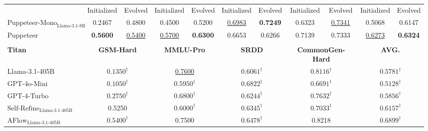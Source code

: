 \documentclass{article}
\begin{document}
\begin{table}[ht]
{\begin{tabular}{lcccccccccc}
\cmidrule(r){2-11} 
& Initialized & Evolved & Initialized & Evolved & Initialized & Evolved & Initialized & Evolved & Initialized & Evolved \\
\cmidrule(r){2-3} \cmidrule(r){4-5} \cmidrule(r){6-7} \cmidrule(r){8-9} \cmidrule(r){10-11}
\rowcolor{gray!6}
$\text{Puppeteer-Mono}_{\text{Llama-3.1-8B}}$ & 0.2467 & 0.4800 & 0.4500 & 0.5200 & \underline{0.6983} & \textbf{0.7249} & 0.6323 & \underline{0.7341} & 0.5068 &0.6147 \\
Puppeteer & \textbf{0.5600} & \underline{0.5400} & \underline{0.5700} & \textbf{0.6300} & 0.6653 & 0.6266 & 0.7139 & 0.7333 & \underline{0.6273} & \textbf{0.6324} \\
\bottomrule
\\[3pt] 
\toprule 
\textbf{Titan}
& \multicolumn{2}{c}{\textbf{GSM-Hard}} & \multicolumn{2}{c}{\textbf{MMLU-Pro}} & \multicolumn{2}{c}{\textbf{SRDD}} & \multicolumn{2}{c}{\textbf{CommonGen-Hard}} & \multicolumn{2}{c}{\textbf{AVG.}} \\
\midrule
\rowcolor{gray!6}
Llama-3.1-405B & \multicolumn{2}{c}{\(\text{0.1350}^{\dagger}\)} & \multicolumn{2}{c}{\underline{0.7600}} & \multicolumn{2}{c}{\(\text{0.6061}^{\dagger}\)} & \multicolumn{2}{c}{\(\text{0.8116}^{\dagger}\)} & \multicolumn{2}{c}{\(\text{0.5781}^{\dagger}\)} \\
GPT-4o-Mini & \multicolumn{2}{c}{\(\text{0.1050}^{\dagger}\)} & \multicolumn{2}{c}{\(\text{0.5950}^{\dagger}\)} & \multicolumn{2}{c}{\(\text{0.6822}^{\dagger}\)} & \multicolumn{2}{c}{\(\text{0.6691}^{\dagger}\)} & \multicolumn{2}{c}{\(\text{0.5128}^{\dagger}\)} \\
\rowcolor{gray!6}
GPT-4-Turbo & \multicolumn{2}{c}{\(\text{0.2750}^{\dagger}\)} & \multicolumn{2}{c}{\(\text{0.6800}^{\dagger}\)} & \multicolumn{2}{c}{\(\text{0.6244}^{\dagger}\)} & \multicolumn{2}{c}{\(\text{0.7632}^{\dagger}\)} & \multicolumn{2}{c}{\(\text{0.5856}^{\dagger}\)} \\
\(\text{Self-Refine}_{\text{Llama-3.1-405B}}\) & \multicolumn{2}{c}{{0.5250}} & \multicolumn{2}{c}{\(\text{0.6000}^{\dagger}\)} & \multicolumn{2}{c}{\(\text{0.6345}^{\dagger}\)} & \multicolumn{2}{c}{\(\text{0.7033}^{\dagger}\)} & \multicolumn{2}{c}{\(\text{0.6157}^{\dagger}\)} \\
\rowcolor{gray!6}
\(\text{AFlow}_{\text{Llama-3.1-405B}}\)  & \multicolumn{2}{c}{\(\text{0.5400}^{\dagger}\)} & \multicolumn{2}{c}{0.7500} & \multicolumn{2}{c}{\(\text{0.6478}^{\dagger}\)} & \multicolumn{2}{c}{0.8218} & \multicolumn{2}{c}{\(\text{0.6899}^{\dagger}\)} \\

\end{tabular}}
\end{table}
\end{document}
